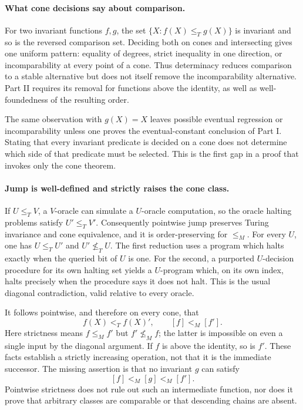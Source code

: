 \documentclass[11pt]{article}
\begin{document}
\paragraph{What cone decisions say about comparison.}
For two invariant functions $f,g$, the set
$\{X:f(X)\le_Tg(X)\}$ is invariant and so is the reversed comparison
set. Deciding both on cones and intersecting gives one uniform pattern:
equality of degrees, strict inequality in one direction, or
incomparability at every point of a cone. Thus determinacy reduces
comparison to a stable alternative but does not itself remove the
incomparability alternative. Part II requires its removal for functions
above the identity, as well as well-foundedness of the resulting order.

The same observation with $g(X)=X$ leaves possible eventual regression
or incomparability unless one proves the eventual-constant conclusion
of Part I. Stating that every invariant predicate is decided on a cone
does not determine which side of that predicate must be selected.
This is the first gap in a proof that invokes only the cone theorem.

\paragraph{Jump is well-defined and strictly raises the cone class.}
If $U\le_TV$, a $V$-oracle can simulate a $U$-oracle computation,
so the oracle halting problems satisfy $U'\le_TV'$. Consequently
pointwise jump preserves Turing invariance and cone equivalence, and
it is order-preserving for $\le_M$. For every $U$, one has $U\le_TU'$
and $U'\not\le_TU$. The first reduction uses a program which halts
exactly when the queried bit of $U$ is one. For the second, a purported
$U$-decision procedure for its own halting set yields a $U$-program
which, on its own index, halts precisely when the procedure says it
does not halt. This is the usual diagonal contradiction, valid
relative to every oracle.

It follows pointwise, and therefore on every cone, that
\[
 f(X)<_T f(X)',\qquad [f]<_M[f'].
\]
Here strictness means $f\le_M f'$ but $f'\not\le_M f$; the latter
is impossible on even a single input by the diagonal argument.
If $f$ is above the identity, so is $f'$. These facts establish a
strictly increasing operation, not that it is the immediate successor.
The missing assertion is that no invariant $g$ can satisfy
\[
 [f]<_M[g]<_M[f'].
\]
Pointwise strictness does not rule out such an intermediate function,
nor does it prove that arbitrary classes are comparable or that
descending chains are absent.
\end{document}
